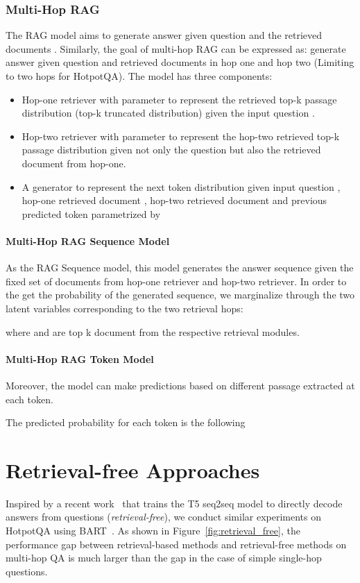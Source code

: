 \documentclass{article} \usepackage{iclr2021_conference,times}
\begin{document}
\subsubsection{Multi-Hop RAG}

The RAG model aims to generate answer  given question  and the retrieved documents . Similarly, the goal of multi-hop RAG can be expressed as: generate answer  given question  and retrieved documents in hop one  and hop two  (Limiting to two hops for HotpotQA). The model has three components: 
\begin{itemize}
    \item Hop-one retriever  with parameter  to represent the retrieved top-k passage distribution (top-k truncated distribution) given the input question . 
    \item Hop-two retriever  with parameter  to represent the hop-two retrieved top-k passage distribution given not only the question  but also the retrieved document  from hop-one. 
    \item A generator  to represent the next token distribution given input question , hop-one retrieved document , hop-two retrieved document  and previous predicted token  parametrized by 
\end{itemize}
 \paragraph{Multi-Hop RAG Sequence Model}
 As the RAG Sequence model, this model generates the answer sequence given the fixed set of documents from hop-one retriever and hop-two retriever. In order to the get the probability of the generated sequence, we marginalize through the two latent variables corresponding to the two retrieval hops:

where  and  are top k document from the respective retrieval modules.

 \paragraph{Multi-Hop RAG Token Model}
 Moreover, the model can make predictions based on different passage extracted at each token. 


The predicted probability for each token is the following




\section{Retrieval-free Approaches}
\label{appendix:retrieval_free}
Inspired by a recent work~\citep{t5close} that trains the T5 seq2seq model to directly decode answers from  questions (\textit{retrieval-free}), we conduct similar experiments on HotpotQA using BART~\citep{BART}. As shown in Figure~\ref{fig:retrieval_free}, the performance gap between retrieval-based methods and retrieval-free methods on multi-hop QA is much larger than the gap in the case of simple single-hop questions. 
\end{document}
